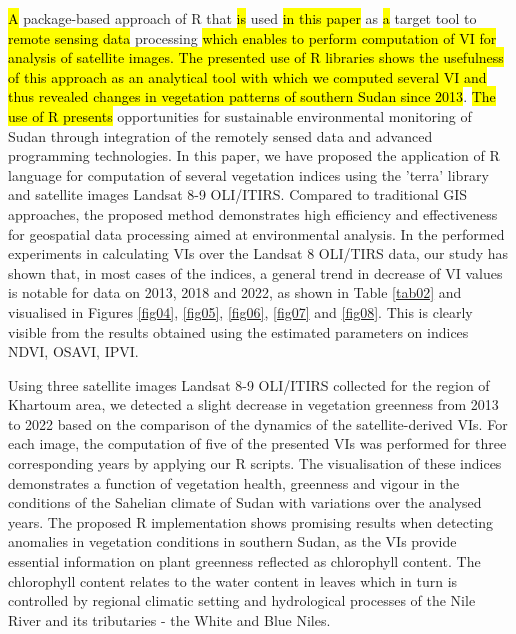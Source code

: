 \documentclass[jimaging,article,submit,pdftex,moreauthors]{Definitions/mdpi}
\begin{document}
\hl{A }package-based approach of R that \hl{is} used \hl{in this paper }as \hl{a }target tool to \hl{remote sensing data} processing \hl{which enables to perform computation of VI for analysis of satellite images. The presented use of R libraries shows the usefulness of this approach as an analytical tool with which we computed several VI and thus revealed changes in vegetation patterns of southern Sudan since 2013}. \hl{The use of R presents }opportunities for sustainable environmental monitoring of Sudan through integration of the remotely sensed data and advanced programming technologies. In this paper, we have proposed the application of R language for computation of several vegetation indices using the 'terra' library and satellite images Landsat 8-9 OLI/ITIRS. Compared to traditional GIS approaches, the proposed method demonstrates high efficiency and effectiveness for geospatial data processing aimed at environmental analysis. In the performed experiments in calculating VIs over the Landsat 8 OLI/TIRS data, our study has shown that, in most cases of the indices, a general trend in decrease of VI values is notable for data on 2013, 2018 and 2022, as shown in Table \ref{tab02} and visualised in Figures \ref{fig04}, \ref{fig05}, \ref{fig06}, \ref{fig07} and \ref{fig08}. This is clearly visible from the results obtained using the estimated parameters on indices NDVI, OSAVI, IPVI. 

Using three satellite images Landsat 8-9 OLI/ITIRS collected for the region of Khartoum area, we detected a slight decrease in vegetation greenness from 2013 to 2022 based on the comparison of the dynamics of the satellite-derived VIs. For each image, the computation of five of the presented VIs was performed for three corresponding years by applying our R scripts. The visualisation of these indices demonstrates a function of vegetation health, greenness and vigour in the conditions of the Sahelian climate of Sudan with variations over the analysed years. The proposed R implementation shows promising results when detecting anomalies in vegetation conditions in southern Sudan, as the VIs provide essential information on plant greenness reflected as chlorophyll content. The chlorophyll content relates to the water content in leaves which in turn is controlled by regional climatic setting and hydrological processes of the Nile River and its tributaries - the White and Blue Niles. 
\end{document}
